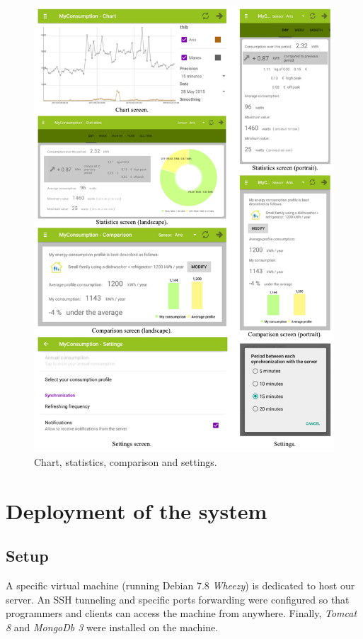 \documentclass[a4paper, oneside, 11pt]{book}
\begin{document}
\begin{figure}[htbp]
	\centerline{\includegraphics[width=1\textwidth]{screenshot2.pdf}}
	\caption{Chart, statistics, comparison and settings.}
	\label{fig:screenshot2}
\end{figure}

\chapter{Deployment of the system}

\section*{Setup}
A specific virtual machine (running Debian 7.8 \textit{Wheezy}) is dedicated to host our server. An SSH tunneling and specific ports forwarding were configured so that programmers and clients can access the machine from anywhere. Finally, \textit{Tomcat 8} and \textit{MongoDb 3} were installed on the machine.\\
\end{document}
